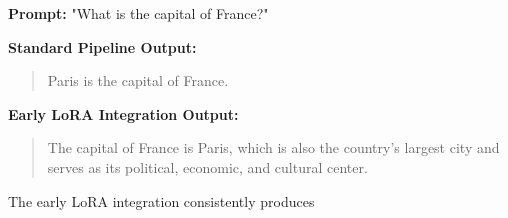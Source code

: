 \textbf{Prompt:} "What is the capital of France?"

\textbf{Standard Pipeline Output:}
\begin{quote}
Paris is the capital of France.
\end{quote}

\textbf{Early LoRA Integration Output:}
\begin{quote}
The capital of France is Paris, which is also the country's largest city and serves as its political, economic, and cultural center.
\end{quote}

The early LoRA integration consistently produces 